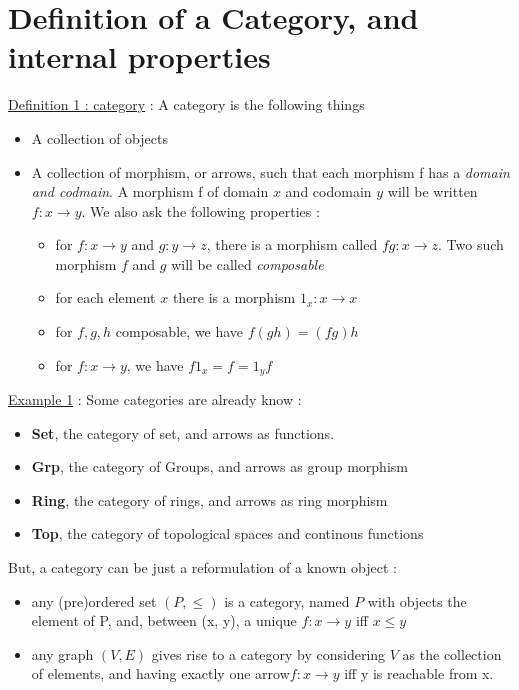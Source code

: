 \documentclass{article}
\begin{document}
\section{Definition of a Category, and internal properties}
\large \underline{Definition 1 : category} \normalsize: A category is the following things \newline
\begin{itemize}[noitemsep]
    \item A collection of objects
    \item A collection of morphism, or arrows, such that each morphism f has a \textit{domain and codmain}. A morphism f of domain $x$ and codomain $y$ will be written $f : x \rightarrow y$. We also ask the following properties : \begin{itemize}[noitemsep]
        \item for $f : x \rightarrow y$ and $ g : y \rightarrow z$, there is a morphism called $fg : x \rightarrow z$. Two such morphism $f$ and $g$ will be called \textit{composable} \newline
        \item  for each element $x$ there is a morphism $1_x : x \rightarrow x$
        \item for $f,g, h$ composable, we have $f(gh) = (fg)h$
        \item for $f : x \rightarrow y$, we have $f 1_x = f = 1_y f $
\end{itemize}
\end{itemize}
\newline 
\noindent 
\large \underline{Example 1} :  \normalsize
Some categories are already know : \begin{itemize}[noitemsep]
\item \textbf{Set}, the category of set, and arrows as functions. 
\item \textbf{Grp}, the category of Groups, and arrows as group morphism
\item \textbf{Ring}, the category of rings, and arrows as ring morphism
\item \textbf{Top}, the category of topological spaces and continous functions \newline

\end{itemize}
But, a category can be just a reformulation of a known object : 
\begin{itemize}[noitemsep]
\item any (pre)ordered set $(P, \leq)$ is a category, named $P$ with objects the element of P, and, between (x, y), a unique $f : x \rightarrow y$ iff $x \leq y$
\item any graph $(V, E)$ gives rise to a category by considering $V$ as the collection of elements, and having exactly one arrow$f : x \rightarrow y$ iff y is reachable from x.  \newline
\end{itemize}
\end{document}
